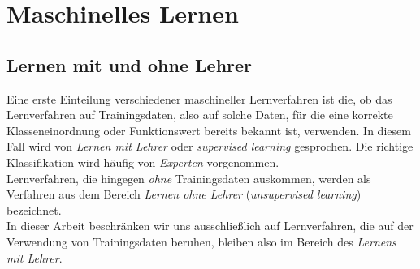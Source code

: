 \documentclass[fontsize=11pt]{scrartcl}
\begin{document}
        \section{Maschinelles Lernen}
            
            \subsection{Lernen mit und ohne Lehrer}
                Eine erste Einteilung verschiedener maschineller Lernverfahren ist die, ob das Lernverfahren auf Trainingsdaten, also auf solche Daten, für die eine korrekte Klasseneinordnung oder Funktionswert bereits bekannt ist, verwenden. In diesem Fall wird von \emph{Lernen mit Lehrer} oder \emph{supervised learning} gesprochen. Die richtige Klassifikation wird häufig von \emph{Experten} vorgenommen.\cite{ertel2016}
                \\
                Lernverfahren, die hingegen \emph{ohne} Trainingsdaten auskommen, werden als Verfahren aus dem Bereich \emph{Lernen ohne Lehrer} (\emph{unsupervised learning}) bezeichnet.\\
                In dieser Arbeit beschränken wir uns ausschließlich auf Lernverfahren, die auf der Verwendung von Trainingsdaten beruhen, bleiben also im Bereich des \emph{Lernens mit Lehrer}.
\end{document}
